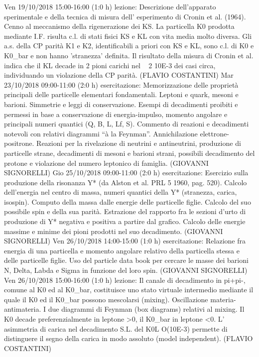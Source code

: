 \begin{itemize}
Ven 19/10/2018 15:00-16:00 (1:0 h) lezione: Descrizione dell'apparato sperimentale e della tecnica di misura dell' esperimento di Cronin et al. (1964). Cenno al meccanismo della rigenerazione dei KS. La particella K0 prodotta mediante I.F. risulta c.l. di stati fisici KS e KL con vita media molto diversa. Gli a.s. della CP parità K1 e K2, identificabili a priori con KS e KL, sono c.l. di K0 e K0_bar e non hanno 'stranezza' definita. Il risultato della misura di Cronin et al. indica che il KL decade in 2 pioni carichi nel ~ 2 10E-3 dei casi circa, individuando un violazione della CP parità. (FLAVIO COSTANTINI)
Mar 23/10/2018 09:00-11:00 (2:0 h) esercitazione: Memorizzazione delle proprietà principali delle particelle elementari fondamentali. Leptoni e quark, mesoni e barioni. Simmetrie e leggi di conservazione. Esempi di decadimenti proibiti e permessi in base a conservazione di energia-impulso, momento angolare e principali numeri quantici (Q, B, L, Lf, S). Commento di reazioni e decadimenti notevoli con relativi diagrammi “à la Feynman”. Annichilazione elettrone-positrone. Reazioni per la rivelazione di neutrini e antineutrini, produzione di particelle strane, decadimenti di mesoni e barioni strani, possibili decadimento del protone e violazione del numero leptonico di famiglia. (GIOVANNI SIGNORELLI)
Gio 25/10/2018 09:00-11:00 (2:0 h) esercitazione: Esercizio sulla produzione della risonanza Y* (da Alston et al. PRL 5 1960, pag. 520). Calcolo dell'energia nel centro di massa, numeri quantici della Y* (stranezza, carica, isospin). Computo della massa dalle energie delle particelle figlie. Calcolo del suo possibile spin e della sua parità. Estrazione del rapporto fra le sezioni d’urto di produzione di Y* negativa e positiva a partire dal grafico. Calcolo delle energie massime e minime dei pioni prodotti nel suo decadimento. (GIOVANNI SIGNORELLI)
Ven 26/10/2018 14:00-15:00 (1:0 h) esercitazione: Relazione fra energia di una particella e momento angolare relativo della particella stessa e delle particelle figlie. Uso del particle data book per cercare le masse dei barioni N, Delta, Labda e Sigma in funzione del loro spin. (GIOVANNI SIGNORELLI)
Ven 26/10/2018 15:00-16:00 (1:0 h) lezione: Il canale di decadimento in pi+pi-, comune al K0 ed al K0_bar, costituisce uno stato virtuale intermedio mediante il quale il K0 ed il K0_bar possono mescolarsi (mixing). Oscillazione materia-antimateria. I due diagrammi di Feynman (box diagrams) relativi al mixing. Il K0 decade preferenzialmente in leptone >0, il K0_bar in leptone <0. L' asimmetria di carica nel decadimento S.L. del K0L O(10E-3) permette di distinguere il segno della carica in modo assoluto (model independent). (FLAVIO COSTANTINI)

\end{itemize}
